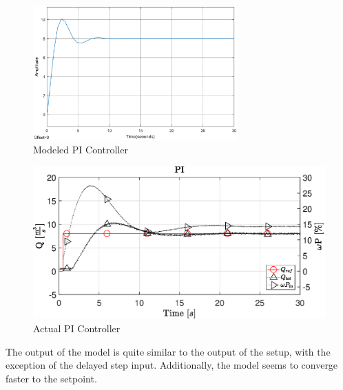 \begin{figure}[H]
	\centering
	\includegraphics[width=0.7\textwidth]{figures/06ModelValidation/modelPI.eps}
	\caption{Modeled PI Controller}
	\label{fig:modeledPI2}
\end{figure}
\vspace{-5mm}
\begin{figure}[H]
    \centering
    \includegraphics[width=\textwidth]{figures/07controllerDesign/PItest.eps}
    \caption{Actual PI Controller}
	\label{fig:actualPI2}
\end{figure}
The output of the model is quite similar to the output of the setup, with the exception of the delayed step input.
Additionally, the model seems to converge faster to the setpoint.

